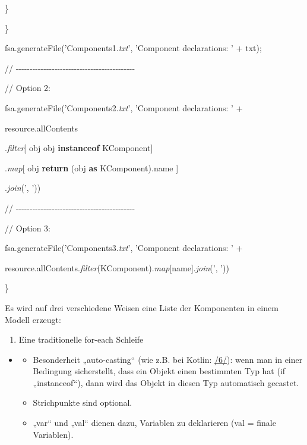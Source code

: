 \documentclass[]{article}
\providecommand{\tightlist}{%
  \setlength{\itemsep}{0pt}\setlength{\parskip}{0pt}}
\begin{document}
\}

\}

fsa.generateFile('Components1.\emph{txt}', 'Component declarations: ' +
txt);

//
-\/-\/-\/-\/-\/-\/-\/-\/-\/-\/-\/-\/-\/-\/-\/-\/-\/-\/-\/-\/-\/-\/-\/-\/-\/-\/-\/-\/-\/-\/-\/-\/-\/-\/-\/-\/-\/-\/-\/-\/-\/-\/-

// Option 2:

fsa.generateFile('Components2.\emph{txt}', 'Component declarations: ' +

resource.allContents

.\emph{filter}{[} obj \textbar{} obj \textbf{instanceof} KComponent{]}

.\emph{map}{[} obj \textbar{} \textbf{return} (obj \textbf{as}
KComponent).name {]}

.\emph{join}(', '))

//
-\/-\/-\/-\/-\/-\/-\/-\/-\/-\/-\/-\/-\/-\/-\/-\/-\/-\/-\/-\/-\/-\/-\/-\/-\/-\/-\/-\/-\/-\/-\/-\/-\/-\/-\/-\/-\/-\/-\/-\/-\/-\/-

// Option 3:

fsa.generateFile('Components3.\emph{txt}', 'Component declarations: ' +

resource.allContents.\emph{filter}(KComponent).\emph{map}{[}name{]}.\emph{join}(',
'))

\}

Es wird auf drei verschiedene Weisen eine Liste der Komponenten in einem
Modell erzeugt:

\begin{enumerate}
\def\labelenumi{\arabic{enumi}.}
\tightlist
\item
  Eine traditionelle for-each Schleife
\end{enumerate}

\begin{itemize}
\item
  \begin{itemize}
  \tightlist
  \item
    Besonderheit „auto-casting`` (wie z.B. bei Kotlin:
    \protect\hyperlink{anchor-11}{/6/}): wenn man in einer Bedingung
    sicherstellt, dass ein Objekt einen bestimmten Typ hat (if
    „instanceof``), dann wird das Objekt in diesen Typ automatisch
    gecastet.
  \item
    Strichpunkte sind optional.
  \item
    „var`` und „val`` dienen dazu, Variablen zu deklarieren (val =
    finale Variablen).
  \end{itemize}
\end{itemize}
\end{document}
